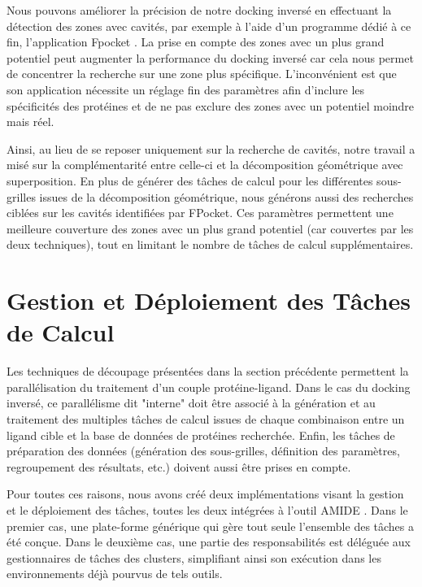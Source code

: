 Nous pouvons améliorer la précision de notre docking inversé en effectuant la détection des zones avec cavités, par exemple à l'aide d'un programme dédié à ce fin, l'application Fpocket \cite{Guilloux09a}. La prise en compte des zones avec un plus grand potentiel peut augmenter la performance du docking inversé car cela nous permet de concentrer la recherche sur une zone plus spécifique. L'inconvénient est que son application nécessite un réglage fin des paramètres afin d'inclure les spécificités des protéines et de ne pas exclure des zones avec un potentiel moindre mais réel. 

Ainsi, au lieu de se reposer uniquement sur la recherche de cavités, notre travail a misé sur la complémentarité entre celle-ci et la décomposition géométrique avec superposition. En plus de générer des tâches de calcul pour les différentes sous-grilles issues de la décomposition géométrique, nous générons aussi des recherches ciblées sur les cavités identifiées par FPocket. Ces paramètres permettent une meilleure couverture des zones avec un plus grand potentiel (car couvertes par les deux techniques), tout en limitant le nombre de tâches de calcul supplémentaires.


\section{Gestion et Déploiement des Tâches de Calcul}

Les techniques de découpage présentées dans la section précédente permettent la parallélisation du traitement d'un couple protéine-ligand. Dans le cas du docking inversé, ce parallélisme dit "interne" doit être associé à la génération et au traitement des multiples tâches de calcul issues de chaque combinaison entre un ligand cible et la base de données de protéines recherchée. Enfin, les tâches de préparation des données (génération des sous-grilles, définition des paramètres, regroupement des résultats, etc.) doivent aussi être prises en compte. 

Pour toutes ces raisons, nous avons créé deux implémentations visant la gestion et le déploiement des tâches, toutes les deux intégrées à l'outil AMIDE \cite{Vasseur2015}. Dans le premier cas, une plate-forme générique qui gère tout seule l'ensemble des tâches a été conçue. Dans le deuxième cas, une partie des responsabilités est déléguée aux gestionnaires de tâches des clusters, simplifiant ainsi son exécution dans les environnements déjà pourvus de tels outils.

